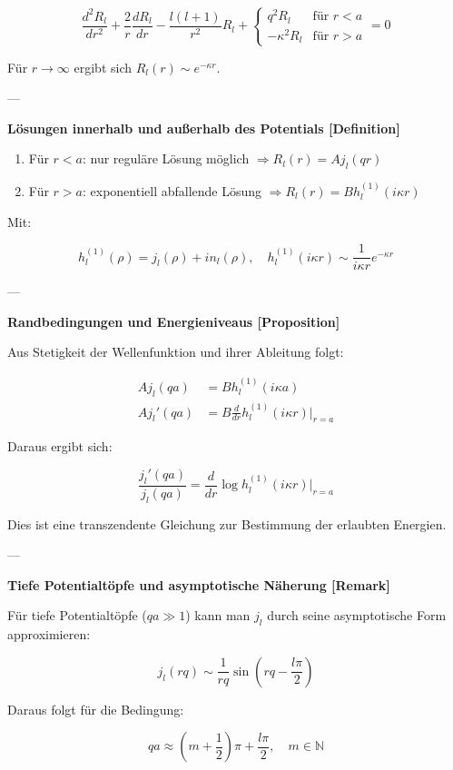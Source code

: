 \documentclass[10pt, letterpaper]{article}
\begin{document}
\[
\frac{d^2 R_l}{dr^2} + \frac{2}{r} \frac{dR_l}{dr} - \frac{l(l+1)}{r^2} R_l + 
\begin{cases}
q^2 R_l & \text{für } r < a \\
-\kappa^2 R_l & \text{für } r > a
\end{cases}
= 0
\]

Für $r \to \infty$ ergibt sich $R_l(r) \sim e^{-\kappa r}$.

---

\textbf{Lösungen innerhalb und außerhalb des Potentials [Definition]}

\begin{enumerate}
  \item Für $r < a$: nur reguläre Lösung möglich $\Rightarrow R_l(r) = A j_l(qr)$
  \item Für $r > a$: exponentiell abfallende Lösung $\Rightarrow R_l(r) = B h_l^{(1)}(i \kappa r)$
\end{enumerate}

Mit:

\[
h_l^{(1)}(\rho) = j_l(\rho) + i n_l(\rho), \quad
h_l^{(1)}(i \kappa r) \sim \frac{1}{i \kappa r} e^{-\kappa r}
\]

---

\textbf{Randbedingungen und Energieniveaus [Proposition]}

Aus Stetigkeit der Wellenfunktion und ihrer Ableitung folgt:

\[
\begin{aligned}
A j_l(qa) &= B h_l^{(1)}(i \kappa a) \\
A j_l'(qa) &= B \frac{d}{dr} h_l^{(1)}(i \kappa r)\big|_{r=a}
\end{aligned}
\]

Daraus ergibt sich:

\[
\frac{j_l'(qa)}{j_l(qa)} = \frac{d}{dr} \log h_l^{(1)}(i \kappa r) \Big|_{r=a}
\]

Dies ist eine transzendente Gleichung zur Bestimmung der erlaubten Energien.

---

\textbf{Tiefe Potentialtöpfe und asymptotische Näherung [Remark]}

Für tiefe Potentialtöpfe ($qa \gg 1$) kann man $j_l$ durch seine asymptotische Form approximieren:

\[
j_l(rq) \sim \frac{1}{rq} \sin(rq - \frac{l\pi}{2})
\]

Daraus folgt für die Bedingung:

\[
qa \approx \left( m + \frac{1}{2} \right) \pi + \frac{l\pi}{2}, \quad m \in \mathbb{N}
\]
\end{document}
